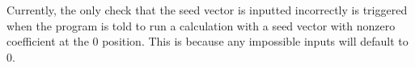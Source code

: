 \documentclass{article}
\begin{document}
Currently, the only check that the seed vector is inputted incorrectly is triggered when the program is told to run a calculation with a seed vector with nonzero coefficient at the 0 position. This is because any impossible inputs will default to 0.


\end{document}
